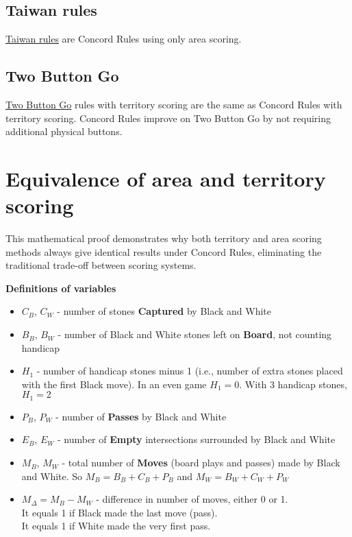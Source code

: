 \documentclass[11pt]{article}
\begin{document}
\subsection*{Taiwan rules}
\href{https://senseis.xmp.net/?TaiwanRules}{Taiwan rules} are Concord Rules using only area scoring.

\subsection*{Two Button Go}
\href{https://senseis.xmp.net/?TwoButtonGo}{Two Button Go} rules with territory scoring are the same as Concord Rules with territory scoring.
Concord Rules improve on Two Button Go by not requiring additional physical buttons.


\newpage
\section*{Equivalence of area and territory scoring}

This mathematical proof demonstrates why both territory and area scoring methods always give identical results under Concord Rules, eliminating the traditional trade-off between scoring systems.

\textbf{Definitions of variables}

\begin{itemize}
\item $C_B$, $C_W$ - number of stones \textbf{Captured} by Black and White
\item $B_B$, $B_W$ - number of Black and White stones left on \textbf{Board}, not counting handicap
\item $H_1$ - number of handicap stones minus 1 (i.e., number of extra stones placed with the first Black move).
In an even game $H_1 = 0$. With 3 handicap stones, $H_1 = 2$
\item $P_B$, $P_W$ - number of \textbf{Passes} by Black and White
\item $E_B$, $E_W$ - number of \textbf{Empty} intersections surrounded by Black and White
\item $M_B$, $M_W$ - total number of \textbf{Moves} (board plays and passes) made by Black and White.
So $M_B = B_B + C_B + P_B$ and $M_W = B_W + C_W + P_W$
\item $M_\Delta = M_B - M_W$ - difference in number of moves, either 0 or 1. \\
It equals 1 if Black made the last move (pass).\\
It equals 1 if White made the very first pass.
\end{itemize}
\end{document}
